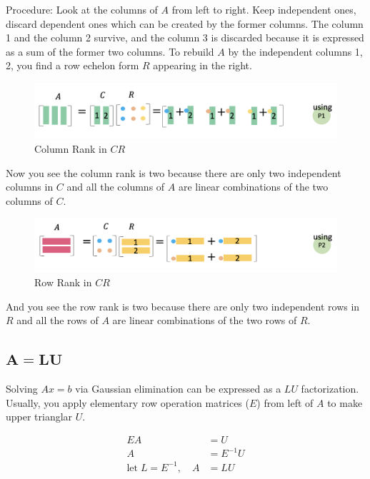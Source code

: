 \documentclass[letterpaper]{article}
\begin{document}
Procedure: Look at the columns of $A$ from left to right. Keep independent ones,
discard dependent ones which can be created by the former columns.
The column 1 and the column 2 survive, and the column 3 is discarded
because it is expressed as a sum of the former two columns.
To rebuild $A$ by the independent columns 1, 2, you find a row echelon form $R$
appearing in the right.

\begin{figure}[H]
  \includegraphics[keepaspectratio, width=\linewidth]{CR1.png}
  \caption{Column Rank in $CR$}
\end{figure}

Now you see the column rank is two because there are only two independent columns in $C$
and all the columns of $A$ are linear combinations of the two columns of $C$.

\begin{figure}[H]
  \includegraphics[keepaspectratio, width=\linewidth]{CR2.png}
  \caption{Row Rank in $CR$}
\end{figure}

And you see the row rank is two because there are only two independent rows in $R$
and all the rows of $A$ are linear combinations of the two rows of $R$.

\clearpage

\subsection{$\boldsymbol{A=LU}$}

Solving $Ax=b$  via Gaussian elimination can be expressed as a $LU$ factorization.
Usually, you apply elementary row operation matrices ($E$) from left of $A$ to make upper trianglar $U$.

\begin{align*}
  EA &= U\\
  A &= E^{-1}U\\
\text{let} \; L = E^{-1}, \quad  A &= LU
\end{align*}
\end{document}
